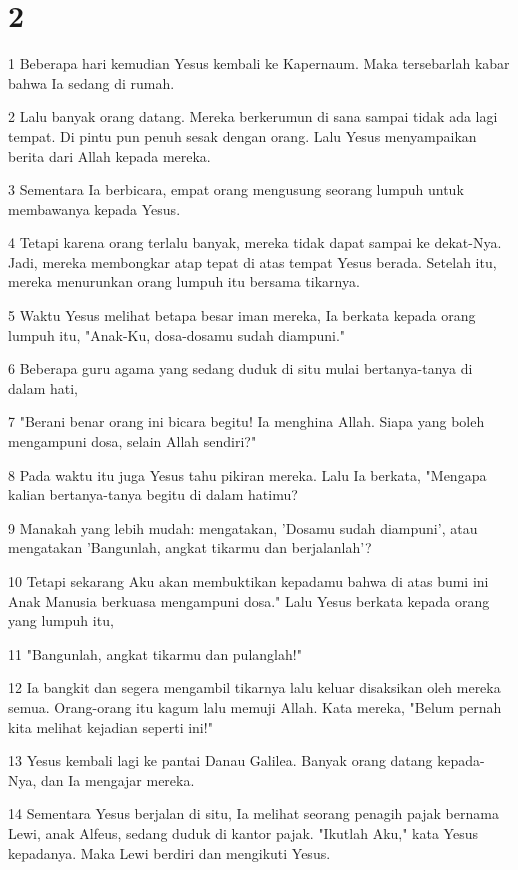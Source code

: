 \chapter{2}

\par 1 Beberapa hari kemudian Yesus kembali ke Kapernaum. Maka tersebarlah kabar bahwa Ia sedang di rumah.
\par 2 Lalu banyak orang datang. Mereka berkerumun di sana sampai tidak ada lagi tempat. Di pintu pun penuh sesak dengan orang. Lalu Yesus menyampaikan berita dari Allah kepada mereka.
\par 3 Sementara Ia berbicara, empat orang mengusung seorang lumpuh untuk membawanya kepada Yesus.
\par 4 Tetapi karena orang terlalu banyak, mereka tidak dapat sampai ke dekat-Nya. Jadi, mereka membongkar atap tepat di atas tempat Yesus berada. Setelah itu, mereka menurunkan orang lumpuh itu bersama tikarnya.
\par 5 Waktu Yesus melihat betapa besar iman mereka, Ia berkata kepada orang lumpuh itu, "Anak-Ku, dosa-dosamu sudah diampuni."
\par 6 Beberapa guru agama yang sedang duduk di situ mulai bertanya-tanya di dalam hati,
\par 7 "Berani benar orang ini bicara begitu! Ia menghina Allah. Siapa yang boleh mengampuni dosa, selain Allah sendiri?"
\par 8 Pada waktu itu juga Yesus tahu pikiran mereka. Lalu Ia berkata, "Mengapa kalian bertanya-tanya begitu di dalam hatimu?
\par 9 Manakah yang lebih mudah: mengatakan, 'Dosamu sudah diampuni', atau mengatakan 'Bangunlah, angkat tikarmu dan berjalanlah'?
\par 10 Tetapi sekarang Aku akan membuktikan kepadamu bahwa di atas bumi ini Anak Manusia berkuasa mengampuni dosa." Lalu Yesus berkata kepada orang yang lumpuh itu,
\par 11 "Bangunlah, angkat tikarmu dan pulanglah!"
\par 12 Ia bangkit dan segera mengambil tikarnya lalu keluar disaksikan oleh mereka semua. Orang-orang itu kagum lalu memuji Allah. Kata mereka, "Belum pernah kita melihat kejadian seperti ini!"
\par 13 Yesus kembali lagi ke pantai Danau Galilea. Banyak orang datang kepada-Nya, dan Ia mengajar mereka.
\par 14 Sementara Yesus berjalan di situ, Ia melihat seorang penagih pajak bernama Lewi, anak Alfeus, sedang duduk di kantor pajak. "Ikutlah Aku," kata Yesus kepadanya. Maka Lewi berdiri dan mengikuti Yesus.
